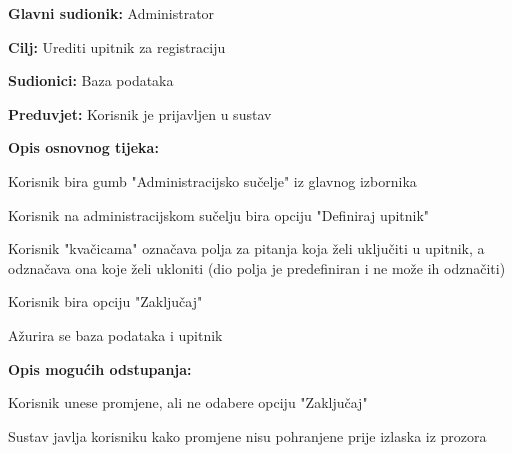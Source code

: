 					\noindent {}
					\begin{packed_item}
						\item \textbf{Glavni sudionik:} Administrator
						\item \textbf{Cilj:} Urediti upitnik za registraciju
						\item \textbf{Sudionici:} Baza podataka
						\item \textbf{Preduvjet:} Korisnik je prijavljen u sustav
						
						\item \textbf{Opis osnovnog tijeka:} 
						\item[] \begin{packed_enum}
							\item Korisnik bira gumb "Administracijsko sučelje" iz glavnog izbornika
							\item Korisnik na administracijskom sučelju bira opciju "Definiraj upitnik"
							\item Korisnik "kvačicama" označava polja za pitanja koja želi uključiti u upitnik, a odznačava ona koje želi ukloniti (dio polja je predefiniran i ne može ih odznačiti)
							\item Korisnik bira opciju "Zaključaj"
							\item Ažurira se baza podataka i upitnik
						\end{packed_enum}
					
						\item \textbf{Opis mogućih odstupanja:}
						\item[] \begin{packed_enum}

							\item[4.a] Korisnik unese promjene, ali ne odabere opciju "Zaključaj"
							\item[] \begin{packed_enum}
								\item[1.] Sustav javlja korisniku kako promjene nisu pohranjene prije izlaska iz prozora
							\end{packed_enum}
							
						\end{packed_enum}
					\end{packed_item}


